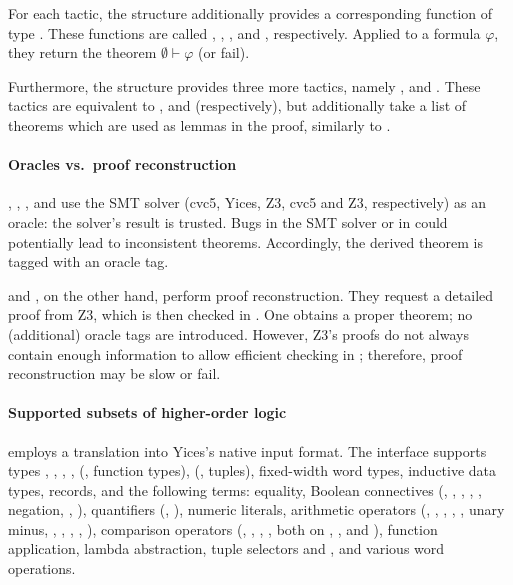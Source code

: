 For each tactic, the  structure additionally provides a
corresponding function of type .  These functions are
called , ,
, and , respectively.  Applied to
a formula $\varphi$, they return the theorem $\emptyset \vdash
\varphi$ (or fail).

Furthermore, the  structure provides three more tactics,
namely ,  and . These tactics
are equivalent to ,  and
 (respectively), but additionally take a list of theorems
which are used as lemmas in the proof, similarly to .

\paragraph{Oracles vs.\ proof reconstruction}

, , ,
 and  use the SMT solver (cvc5, Yices, Z3,
cvc5 and Z3, respectively) as an oracle: the solver's result is
trusted. Bugs in the SMT solver or in  could potentially
lead to inconsistent theorems. Accordingly, the derived theorem is
tagged with an oracle tag.

 and , on the other hand, perform proof
reconstruction.  They request a detailed proof from Z3, which is then
checked in \HOL{}. One obtains a proper \HOL{} theorem; no
(additional) oracle tags are introduced. However, Z3's proofs do not
always contain enough information to allow efficient checking in
\HOL{}; therefore, proof reconstruction may be slow or fail.

\paragraph{Supported subsets of higher-order logic}

 employs a translation into Yices's native input
format.  The interface supports types , ,
, , \holtxt{->} (\ie, function types),
 (\ie, tuples), fixed-width word types, inductive data
types, records, and the following terms: equality, Boolean connectives
(, , \holtxt{==>}, \holtxt{/\bs}, \holtxt{\bs /},
negation, , ), quantifiers
(\holtxt{!}, ), numeric literals, arithmetic operators
(, \holtxt{+}, \holtxt{-}, \holtxt{*}, \holtxt{/}, unary
minus, , , , ,
), comparison operators (\holtxt{<}, \holtxt{<=},
\holtxt{>}, \holtxt{>=}, both on , , and
), function application, lambda abstraction, tuple
selectors  and , and various word operations.

